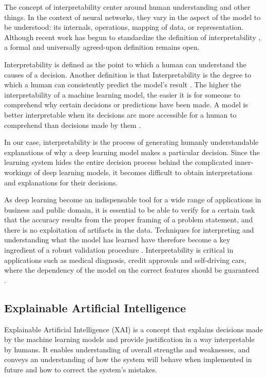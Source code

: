The concept of interpretability center around human understanding and other things. In the context of neural networks, they vary in the aspect of the model to be understood: its internals, operations, mapping of data, or representation. Although recent work has begun to standardize the definition of interpretability \cite{Lipton2018}, a formal and universally agreed-upon definition remains open.

Interpretability is defined as the point to which a human can understand the causes of a decision. Another definition is that Interpretability is the degree to which a human can consistently predict the model’s result \cite{molnar}. The higher the interpretability of a machine learning model, the easier it is for someone to comprehend why certain decisions or predictions have been made. A model is better interpretable when its decisions are more accessible for a human to comprehend than decisions made by them \cite{molnar}.
    
In our case, interpretability is the process of generating humanly understandable explanations of why a deep learning model makes a particular decision. Since the learning system hides the entire decision process behind the complicated inner-workings of deep learning models, it becomes difficult to obtain interpretations and explanations for their decisions.

As deep learning become an indispensable tool for a wide range of applications in business and public domain, it is essential to be able to verify for a certain task that the accuracy results from the proper framing of a problem statement, and there is no exploitation of artifacts in the data. Techniques for interpreting and understanding what the model has learned have therefore become a key ingredient of a robust validation procedure \cite{taylor2006methods} \cite{hansen2011visual} \cite{bach2015pixel}. Interpretability is critical in applications such as medical diagnosis, credit approvals and self-driving cars, where the dependency of the model on the correct features should be guaranteed \cite{Caruana:2015:IMH:2783258.2788613} \cite{bojarski2017explaining}.

\subsection{Explainable Artificial Intelligence}
Explainable Artificial Intelligence (XAI) is a concept that explains decisions made by the machine learning models and provide justification in a way interpretable by humans. It enables understanding of overall strengths and weaknesses, and conveys an understanding of how the system will behave when implemented in future and how to correct the system’s mistakes. 

